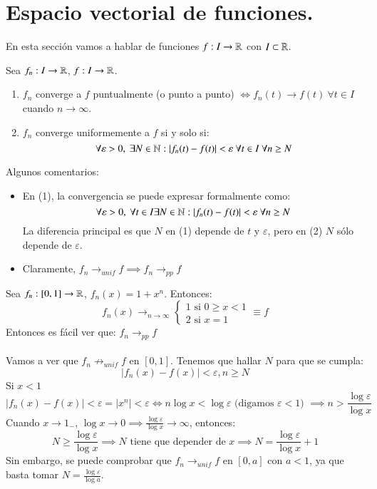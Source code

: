 \section{Espacio vectorial de funciones.}
En esta sección vamos a hablar de funciones $f: I \to \mathbb{R}$ con $I \subset \mathbb{R}$.
\begin{dfn}
    Sea $f_n : I \to \mathbb{R}$, $f: I \to \mathbb{R}$.\\
    \begin{enumerate}
        \item $f_n$ converge a $f$ puntualmente (o punto a punto) $\iff f_n(t) \to f(t)\ \forall t \in I$ cuando $n\to \infty$.
        \item $f_n$ converge uniformemente a $f$ si y solo si:
        $$
            \forall \varepsilon > 0,\ \exists N \in \N : |f_n(t) - f(t)| < \varepsilon\ \forall t \in I\ \forall n \geq N
        $$
    \end{enumerate}
\end{dfn}
\begin{obs}
    Algunos comentarios:\\
    \begin{itemize}
        \item En (1), la convergencia se puede expresar formalmente como:
    $$
        \forall \varepsilon > 0,\ \forall t \in I \exists N \in \mathbb{N} : |f_n(t) - f(t)| < \varepsilon\ \forall n \geq N
    $$
    La diferencia principal es que $N$ en (1) depende de $t$ y $ \varepsilon$, pero en (2) $N$ sólo depende de $\varepsilon$.
        \item Claramente, $f_n \to_{unif} f \implies f_n \to_{pp} f$
\end{itemize}
\end{obs}
\begin{eg}
    Sea $f_n: [0, 1] \to \mathbb{R}$, $f_n(x) = 1+x^n$. Entonces:
    $$
        f_n(x) \to_{n \to \infty}
        \begin{cases}
            1 \text{ si } 0\geq x < 1 \\
            2 \text{ si } x = 1
        \end{cases} \equiv f
    $$
    Entonces es fácil ver que: $f_n \to_{pp} f$\\\\
    Vamos a ver que $f_n \not\to_{unif} f$ en $[0, 1]$. Tenemos que hallar $N$ para que se cumpla:
    $$
        |f_n(x) - f(x)| < \varepsilon, n\geq N
    $$
    Si $x < 1$
    $$
        |f_n(x) - f(x)| < \varepsilon = |x^n| < \varepsilon \iff n \log x < \log \varepsilon \text{ (digamos $\varepsilon < 1$) } \implies n > \frac{\log \varepsilon}{\log x}
    $$
    Cuando $x \to 1_-$, $\log x \to 0 \implies \frac{\log \varepsilon}{\log x} \to \infty$, entonces:
    $$
        N \geq \frac{\log \varepsilon}{\log x} \implies N \text{ tiene que depender de }x \implies N = \frac{\log \varepsilon}{\log x} + 1
    $$
    Sin embargo, se puede comprobar que $f_n \to_{unif} f$ en $[0, a]$ con $a < 1$, ya que basta tomar $N = \frac{\log \varepsilon}{\log a}$.
\end{eg}
